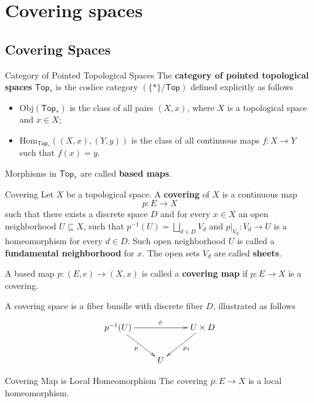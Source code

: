 \documentclass{report}
\newcommand{\Top}{\mathsf{Top}}
\newcommand{\Obj}{\mathrm{Obj}}
\newcommand{\Hom}{\mathrm{Hom}}
\begin{document}
\chapter{Covering spaces}
\section{Covering Spaces}

\begin{definition}{Category of Pointed Topological Spaces}{}
	The \textbf{category of pointed topological spaces} $\Top_*$ is the coslice category $\left(\{*\}/\Top\right)$ defined explicitly as follows
	\begin{itemize}
		\item $\Obj(\Top_*)$ is the class of all pairs $(X,x)$, where $X$ is a topological space and $x\in X$;
		\item $\Hom_{\Top_*}((X,x),(Y,y))$ is the class of all continuous maps $f:X\to Y$ such that $f(x)=y$.
	\end{itemize}
	Morphisms in $\Top_*$ are called \textbf{based maps}.
\end{definition}

\begin{definition}{Covering}{}
	Let $X$ be a topological space. A \textbf{covering} of $X$ is a continuous map
	$$
		p: E \longrightarrow X
	$$
	such that there exists a discrete space $D$ and for every $x \in X$ an open neighborhood $U \subseteq X$, such that $p^{-1}(U)=\bigsqcup_{d \in D} V_d$ and $\left.p\right|_{V_d}: V_d \rightarrow U$ is a homeomorphism for every $d \in D$. Such open neighborhood $U$ is called a \textbf{fundamental neighborhood} for $x$. The open sets $V_d$ are called \textbf{sheets}.
\end{definition}

A based map $p:(E,e)\to (X,x)$ is called a \textbf{covering map} if $p:E\to X$ is a covering.

A covering space is a fiber bundle with discrete fiber $D$, illustrated as follows
\[\xymatrix{
		p^{-1}(U)\ar[rd]_{p}\ar[rr]^{\phi}  & &U\times D\ar[ld]^{p_1}\\
		&U&
	}\]
\begin{proposition}{Covering Map is Local Homeomorphism}{}
	The covering $p:E\to X$ is a local homeomorphism.
\end{proposition}
\end{document}
